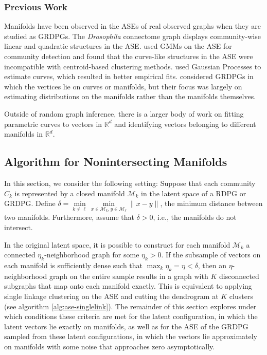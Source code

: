 \documentclass[
  12pt,
]{article}
\theoremstyle{definition}
\theoremstyle{definition}
\theoremstyle{definition}
\theoremstyle{definition}
\theoremstyle{remark}
\begin{document}
\hypertarget{previous-work-1}{%
\subsubsection{Previous Work}\label{previous-work-1}}

Manifolds have been observed in the ASEs of real observed graphs when they are studied as GRDPGs.
The \emph{Drosophila} connectome graph \citep{Eichler141762} displays community-wise linear and quadratic structures in the ASE.
\citet{https://doi.org/10.48550/arxiv.1705.03297} used GMMs on the ASE for community detection and found that the curve-like structures in the ASE were incompatible with centroid-based clustering methods.
\citet{SannaPassino2022} used Gaussian Processes to estimate curves, which resulted in better empirical fits.
\citet{athreya2020estimation} considered GRDPGs in which the vertices lie on curves or manifolds, but their focus was largely on estimating distributions on the manifolds rather than the manifolds themselves.

Outside of random graph inference, there is a larger body of work on fitting parametric curves to vectors in \(\mathbb{R}^d\) and identifying vectors belonging to different manifolds in \(\mathbb{R}^d\).

\hypertarget{sec:nonintersect}{%
\subsection{Algorithm for Nonintersecting Manifolds}\label{sec:nonintersect}}

In this section, we consider the following setting: Suppose that each community \(C_k\) is represented by a closed manifold \(\mathcal{M}_k\) in the latent space of a RDPG or GRDPG.
Define \(\delta = \min\limits_{k \neq \ell} \min\limits_{x \in \mathcal{M}_k, y \in \mathcal{M}_\ell} \|x - y\|\), the minimum distance between two manifolds.
Furthermore, assume that \(\delta > 0\), i.e., the manifolds do not intersect.

In the original latent space, it is possible to construct for each manifold \(\mathcal{M}_k\) a connected \(\eta_k\)-neighborhood graph for some \(\eta_k > 0\).
If the subsample of vectors on each manifold is sufficiently dense such that \(\max_k \eta_k = \eta < \delta\), then an \(\eta\)-neighborhood graph on the entire sample results in a graph with \(K\) disconnected subgraphs that map onto each manifold exactly.
This is equivalent to applying single linkage clustering on the ASE and cutting the dendrogram at \(K\) clusters (see algorithm \ref{alg:ase-singlelink}).
The remainder of this section explores under which conditions these criteria are met for the latent configuration, in which the latent vectors lie exactly on manifolds, as well as for the ASE of the GRDPG sampled from these latent configurations, in which the vectors lie approximately on manifolds with some noise that approaches zero asymptotically.
\end{document}
